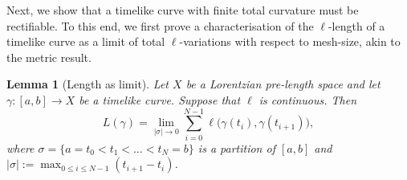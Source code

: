 \documentclass[hidelinks,12pt,a4paper]{article}
\numberwithin{equation}{section}
\theoremstyle{plain}
\newtheorem{lemma}[definition]{Lemma}
\theoremstyle{definition}
\newcommand{\LpLS}{Lo\-rentz\-ian pre-length space }
\begin{document}

Next, we show that a timelike curve with finite total curvature must be rectifiable. 
To this end, we first prove a characterisation of the $\ell$-length of a timelike curve as a limit of total $\ell$-variations with respect to mesh-size, akin to the metric result.

\begin{lemma}[Length as limit]
\label{Length as limit}
Let $X$ be a \LpLS and let $\gamma \colon[a,b] \to X$ be a timelike curve. 
Suppose that $\ell$ is continuous. 
Then 
\begin{equation*}
L(\gamma)=\lim_{|\sigma|\to 0}\sum_{i=0}^{N-1}\ell\big(\gamma(t_i),\gamma(t_{i+1})\big),
\end{equation*}
where $\sigma=\{a=t_0 < t_1 < \ldots < t_N=b\}$ is a partition of $[a,b]$ and $|\sigma|:=\max_{0\le i\le N-1}(t_{i+1}-t_i)$.
\end{lemma}
\end{document}

